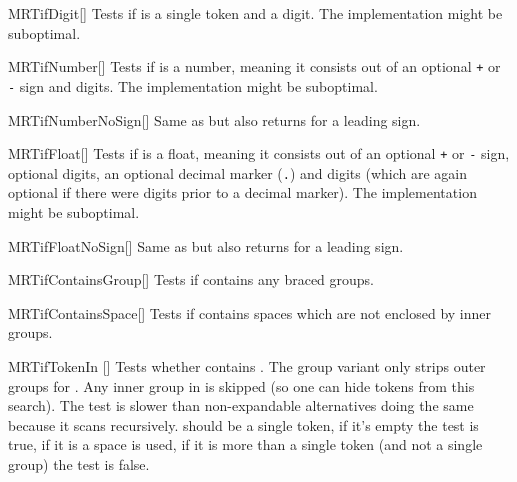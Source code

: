 \begin{describemacroTF}[G,N,GN]{MRTifDigit}[]
  Tests if  is a single token and a digit. The implementation might be
  suboptimal.
\end{describemacroTF}

\begin{describemacroTF}[G,N,GN]{MRTifNumber}[]
  Tests if  is a number, meaning it consists out of an optional
  \texttt{+} or \texttt{-} sign and digits. The implementation might be
  suboptimal.
\end{describemacroTF}

\begin{describemacroTF}[G,N,GN]{MRTifNumberNoSign}[]
  Same as  but also returns  for a leading sign.
\end{describemacroTF}

\begin{describemacroTF}[G,N,GN]{MRTifFloat}[]
  Tests if  is a float, meaning it consists out of an optional
  \texttt{+} or \texttt{-} sign, optional digits, an optional decimal marker
  (\texttt{.}) and digits (which are again optional if there were digits prior
  to a decimal marker). The implementation might be suboptimal.
\end{describemacroTF}

\begin{describemacroTF}[G,N,GN]{MRTifFloatNoSign}[]
  Same as  but also returns  for a leading sign.
\end{describemacroTF}

\begin{describemacroTF}[G,N,GN]{MRTifContainsGroup}[]
  Tests if  contains any braced groups.
\end{describemacroTF}

\begin{describemacroTF}[G,N,GN]{MRTifContainsSpace}[]
  Tests if  contains spaces which are not enclosed by inner groups.
\end{describemacroTF}

\begin{describemacroTF}{MRTifTokenIn}
  []
  Tests whether  contains . The group variant only
  strips outer groups for . Any inner group in  is skipped (so one can hide tokens from this search). The test is slower
  than non-expandable alternatives doing the same because it scans  recursively.  should be a single token, if it's empty the
  test is true, if it is a space  is used, if it is
  more than a single token (and not a single group) the test is false.
\end{describemacroTF}

